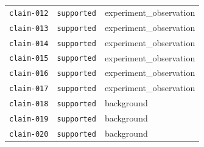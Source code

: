\documentclass[UTF8]{ctexart}
\begin{document}
\begin{longtable}{@{}>{\raggedright\arraybackslash}p{}>{\raggedright\arraybackslash}p{}>{\raggedright\arraybackslash}p{}@{}}
\texttt{\scriptsize claim-\allowbreak{}012} & \texttt{\scriptsize supported} & experiment\_\allowbreak{}observation \\
\texttt{\scriptsize claim-\allowbreak{}013} & \texttt{\scriptsize supported} & experiment\_\allowbreak{}observation \\
\texttt{\scriptsize claim-\allowbreak{}014} & \texttt{\scriptsize supported} & experiment\_\allowbreak{}observation \\
\texttt{\scriptsize claim-\allowbreak{}015} & \texttt{\scriptsize supported} & experiment\_\allowbreak{}observation \\
\texttt{\scriptsize claim-\allowbreak{}016} & \texttt{\scriptsize supported} & experiment\_\allowbreak{}observation \\
\texttt{\scriptsize claim-\allowbreak{}017} & \texttt{\scriptsize supported} & experiment\_\allowbreak{}observation \\
\texttt{\scriptsize claim-\allowbreak{}018} & \texttt{\scriptsize supported} & background \\
\texttt{\scriptsize claim-\allowbreak{}019} & \texttt{\scriptsize supported} & background \\
\texttt{\scriptsize claim-\allowbreak{}020} & \texttt{\scriptsize supported} & background \\
\bottomrule
\end{longtable}
\end{document}

